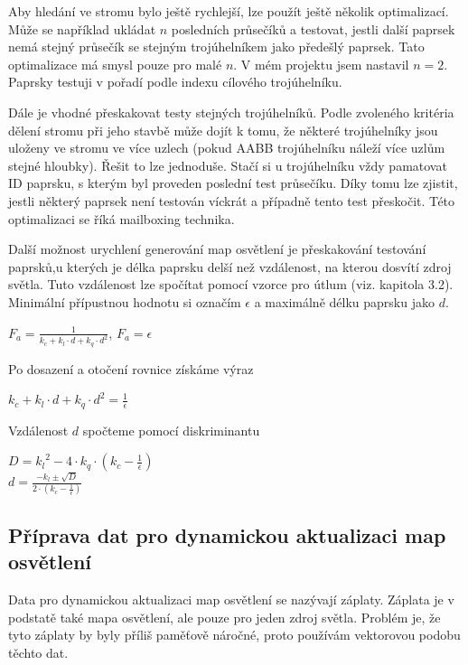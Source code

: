 \documentclass[11pt,twoside,a4paper]{book}
\begin{document}
Aby hledání ve stromu bylo ještě rychlejší, lze použít ještě několik optimalizací. Může se například ukládat $n$ posledních průsečíků a testovat, jestli další paprsek nemá stejný průsečík se stejným trojúhelníkem jako předešlý paprsek. Tato optimalizace má smysl pouze pro malé $n$. V mém projektu jsem nastavil $n = 2$. Paprsky testuji v pořadí podle indexu cílového trojúhelníku.

Dále je vhodné přeskakovat testy stejných trojúhelníků. Podle zvoleného kritéria dělení stromu při jeho stavbě může dojít k tomu, že některé trojúhelníky jsou uloženy ve stromu ve více uzlech (pokud AABB trojúhelníku náleží více uzlům stejné hloubky). Řešit to lze jednoduše. Stačí si u trojúhelníku vždy pamatovat ID paprsku, s kterým byl proveden poslední test průsečíku. Díky tomu lze zjistit, jestli některý paprsek není testován víckrát a případně tento test přeskočit. Této optimalizaci se říká mailboxing technika.

Další možnost urychlení generování map osvětlení je přeskakování testování paprsků,\linebreak u kterých je délka paprsku delší než vzdálenost, na kterou dosvítí zdroj světla. Tuto vzdálenost lze spočítat pomocí vzorce pro útlum (viz. kapitola 3.2). Minimální přípustnou hodnotu si označím $\epsilon$ a maximálně délku paprsku jako $d$.
\begin{center}
$F_a = \frac{1}{k_c + k_l \cdot d + k_q \cdot d^2}$, $F_a = \epsilon$
\end{center}
Po dosazení a otočení rovnice získáme výraz
\begin{center}
$k_c + k_l \cdot d + k_q \cdot d^2 = \frac{1}{\epsilon}$
\end{center}
Vzdálenost $d$ spočteme pomocí diskriminantu
\begin{center}
$D = {k_l}^2 - 4 \cdot k_q \cdot (k_c - \frac{1}{\epsilon})$\\
$d = \frac{-k_l \pm \sqrt{D}}{2 \cdot (k_c - \frac{1}{\epsilon})}$
\end{center}


\subsection{Příprava dat pro dynamickou aktualizaci map osvětlení}
Data pro dynamickou aktualizaci map osvětlení se nazývají záplaty. Záplata je v podstatě také mapa osvětlení, ale pouze pro jeden zdroj světla. Problém je, že tyto záplaty by byly příliš paměťově náročné, proto používám vektorovou podobu těchto dat.
\end{document}
